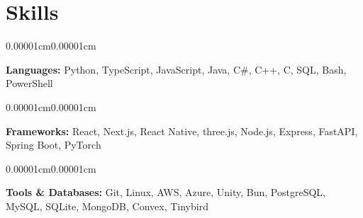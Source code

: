 \documentclass[10pt, letterpaper]{article}
\makeatletter
\newenvironment{onecolentry}{
    \begin{adjustwidth}{0.00001cm}{0.00001cm}
}{
    \end{adjustwidth}
}
\newenvironment{twocolentry}[2][]{
    \onecolentry
    \def\secondColumn{#2}
    \begin{tabular*}{\linewidth}{@{}l@{\extracolsep{\fill}}r@{}}
}{
    & \secondColumn
    \end{tabular*}
    \endonecolentry
}
\makeatother
\begin{document}
\section{Skills}
\vspace{0.10 cm}

\begin{onecolentry}
\textbf{Languages}\textbf{:} Python, TypeScript, JavaScript, Java, C\#, C++, C, SQL, Bash, PowerShell
\end{onecolentry}

\vspace{0.10 cm}

\begin{onecolentry}
\textbf{Frameworks:} React, Next.js, React Native, three.js, Node.js, Express, FastAPI, Spring Boot, PyTorch
\end{onecolentry}

\vspace{0.10 cm}

\begin{onecolentry}
\textbf{Tools \& Databases:} Git, Linux, AWS, Azure, Unity, Bun, PostgreSQL, MySQL, SQLite, MongoDB, Convex, Tinybird
\end{onecolentry}







\end{document}
